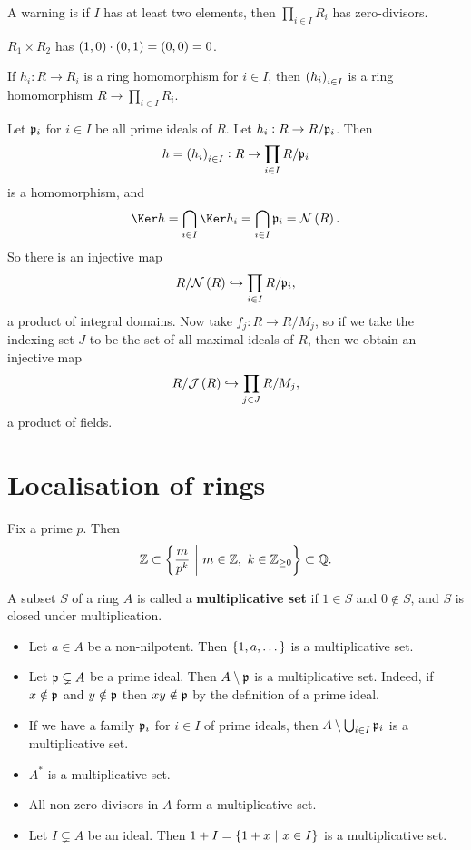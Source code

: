 A warning is if $ I $ has at least two elements, then $ \prod_{i \in I} R_i $ has zero-divisors.

\begin{example*}
$ R_1 \times R_2 $ has $ \br{1, 0} \cdot \br{0, 1} = \br{0, 0} = 0 $.
\end{example*}

If $ h_i : R \to R_i $ is a ring homomorphism for $ i \in I $, then $ \br{h_i}_{i \in I} $ is a ring homomorphism $ R \to \prod_{i \in I} R_i $.

\begin{remark}
Let $ \mathfrak{p}_i $ for $ i \in I $ be all prime ideals of $ R $. Let $ h_i : R \to R / \mathfrak{p}_i $. Then
$$ h = \br{h_i}_{i \in I} : R \to \prod_{i \in I} R / \ppp_i $$
is a homomorphism, and
$$ \Ker h = \bigcap_{i \in I} \Ker h_i = \bigcap_{i \in I} \ppp_i = \NNN\br{R}. $$
So there is an injective map
$$ R / \NNN\br{R} \hookrightarrow \prod_{i \in I} R / \ppp_i, $$
a product of integral domains. Now take $ f_j : R \to R / M_j $, so if we take the indexing set $ J $ to be the set of all maximal ideals of $ R $, then we obtain an injective map
$$ R / \JJJ\br{R} \hookrightarrow \prod_{j \in J} R / M_j, $$
a product of fields.
\end{remark}

\pagebreak

\section{Localisation of rings}

\begin{example*}
Fix a prime $ p $. Then
$$ \ZZ \subset \cbr{\dfrac{m}{p^k} \st m \in \ZZ, \ k \in \ZZ_{\ge 0}} \subset \QQ. $$
\end{example*}

\begin{definition}
A subset $ S $ of a ring $ A $ is called a \textbf{multiplicative set} if $ 1 \in S $ and $ 0 \notin S $, and $ S $ is closed under multiplication.
\end{definition}

\begin{example}
\hfill
\begin{itemize}
\item Let $ a \in A $ be a non-nilpotent. Then $ \cbr{1, a, \dots} $ is a multiplicative set.
\item Let $ \mathfrak{p} \subsetneq A $ be a prime ideal. Then $ A \setminus \mathfrak{p} $ is a multiplicative set. Indeed, if $ x \notin \mathfrak{p} $ and $ y \notin \mathfrak{p} $ then $ xy \notin \mathfrak{p} $ by the definition of a prime ideal.
\item If we have a family $ \mathfrak{p}_i $ for $ i \in I $ of prime ideals, then $ A \setminus \bigcup_{i \in I} \mathfrak{p}_i $ is a multiplicative set.
\item $ A^* $ is a multiplicative set.
\item All non-zero-divisors in $ A $ form a multiplicative set.
\item Let $ I \subsetneq A $ be an ideal. Then $ 1 + I = \cbr{1 + x \st x \in I} $ is a multiplicative set.
\end{itemize}
\end{example}

